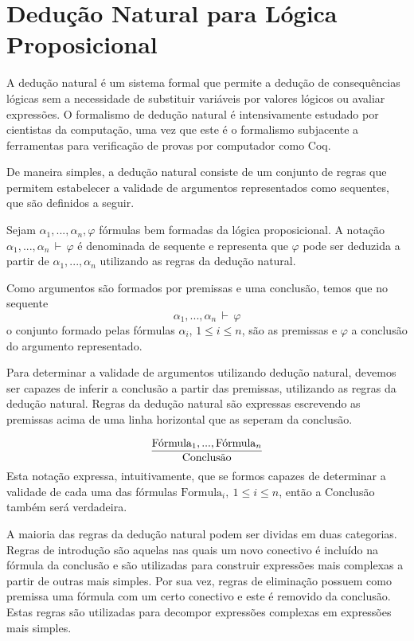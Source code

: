 \section{Dedu\c{c}\~ao Natural para L\'ogica Proposicional}\label{deducao-natural-proposicional}

A dedu\c{c}\~ao natural \'e um sistema formal que permite a
dedu\c{c}\~ao de consequ\^encias l\'ogicas sem a necessidade de
substituir vari\'aveis por valores l\'ogicos ou avaliar express\~oes.
O formalismo de dedu\c{c}\~ao natural \'e intensivamente estudado por
cientistas da computa\c{c}\~ao, uma vez que este \'e o formalismo
subjacente a ferramentas para verifica\c{c}\~ao de provas por
computador como Coq.

De maneira simples, a dedu\c{c}\~ao natural consiste de um conjunto de
regras que permitem estabelecer a validade de argumentos representados
como sequentes, que s\~ao definidos a seguir.

\begin{Definition}[Sequente]
Sejam $\alpha_1,...,\alpha_n,\varphi$ f\'ormulas bem formadas da
l\'ogica proposicional. A nota\c{c}\~ao
$\alpha_1,...,\alpha_n\,\vdash\,\varphi$ \'e denominada de sequente e
representa que $\varphi$ pode ser deduzida a partir de
$\alpha_1,...,\alpha_n$ utilizando as regras da dedu\c{c}\~ao natural.
\end{Definition}

Como argumentos s\~ao formados por premissas e uma conclus\~ao, temos
que no sequente
\[\alpha_1,...,\alpha_n\,\vdash\,\varphi\]
o conjunto formado pelas f\'ormulas $\alpha_i$, $1\leq i \leq n$,
s\~ao as premissas e
$\varphi$ a conclus\~ao do argumento representado.

Para determinar a validade de argumentos utilizando dedu\c{c}\~ao
natural, devemos ser capazes de inferir a conclus\~ao a partir das
premissas, utilizando as regras da dedu\c{c}\~ao natural. Regras da
dedu\c{c}\~ao natural s\~ao expressas escrevendo as premissas acima de
uma linha horizontal que as seperam da conclus\~ao.

\[
      \infer
           {\text{Conclus\~ao}}
          {\text{F\'ormula}_1,...,\text{F\'ormula}_n}
\]
Esta nota\c{c}\~ao expressa, intuitivamente, que se formos capazes de
determinar a validade de cada uma das f\'ormulas $\text{Formula}_i,\:
1\leq i \leq n$, ent\~ao a Conclus\~ao tamb\'em ser\'a verdadeira.

A maioria das regras da dedu\c{c}\~ao natural podem ser dividas em duas categorias.
Regras de introdu\c{c}\~ao s\~ao aquelas nas quais um novo conectivo
\'e inclu\'ido na f\'ormula da conclus\~ao e s\~ao utilizadas para
construir express\~oes mais complexas a partir de outras mais simples.
Por sua vez, regras de elimina\c{c}\~ao possuem como premissa uma
f\'ormula com um certo conectivo e este \'e removido da
conclus\~ao. Estas regras s\~ao utilizadas para decompor express\~oes
complexas em express\~oes mais simples.

